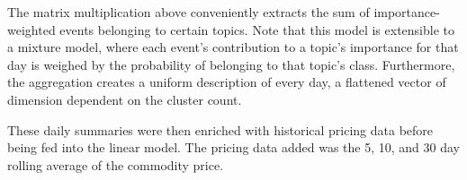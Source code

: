 The matrix multiplication above conveniently extracts the sum of importance-weighted events belonging to certain topics. Note that this model is extensible to a mixture model, where each event's contribution to a topic's importance for that day is weighed by the probability of belonging to that topic's class. Furthermore, the aggregation creates a uniform description of every day, a flattened vector of dimension dependent on the cluster count.

These daily summaries were then enriched with historical pricing data before being fed into the linear model. The pricing data added was the 5, 10, and 30 day rolling average of the commodity price. %
